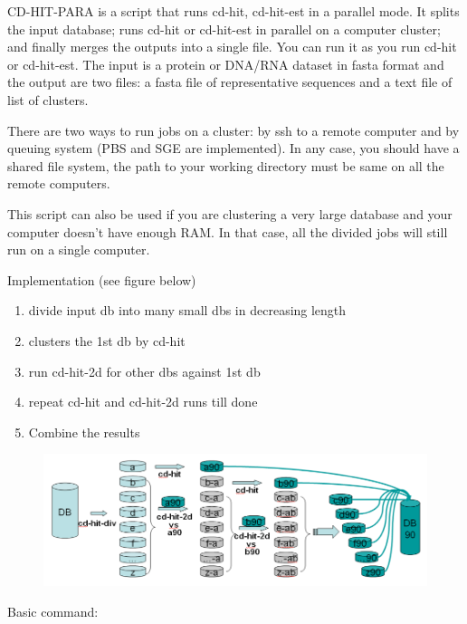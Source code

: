 \documentclass[12pt,a4paper]{article}
\begin{document}
CD-HIT-PARA is a script that runs cd-hit, cd-hit-est in a parallel mode. It
splits the input database; runs cd-hit or cd-hit-est in parallel on a computer
cluster; and finally merges the outputs into a single file.  You can run it as
you run cd-hit or cd-hit-est. The input is a protein or DNA/RNA dataset in
fasta format and the output are two files: a fasta file of representative
sequences and a text file of list of clusters. 

There are two ways to run jobs on a cluster: by ssh to a remote computer and
by queuing system (PBS and SGE are implemented). In any case, you should have
a shared file system, the path to your working directory must be same on all
the remote computers. 

This script can also be used if you are clustering a very large database and
your computer doesn't have enough RAM. In that case, all the divided jobs
will still run on a single computer. 

Implementation (see figure below)

\begin{enumerate}
 \item  divide input db into many small dbs in decreasing length

\item  clusters the 1st db by cd-hit

\item  run cd-hit-2d for other dbs against 1st db

\item  repeat cd-hit and cd-hit-2d runs till done

\item  Combine the results

\end{enumerate}

\begin{figure}[!h]
\includegraphics[width=\textwidth]{Figure3.png}

\end{figure}

Basic command:
\end{document}
